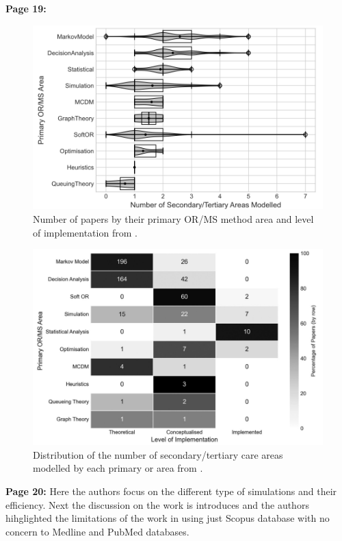     \textbf{Page 19:}
    \begin{figure}[H]
        \centering
        \includegraphics[width=.9\textwidth]{figures/SR0005GB23/fig7.png}
        \caption{Number of papers by their primary OR/MS method area and level of implementation from \cite{x122}.}
        \label{fig7:SR0005GB23}
    \end{figure}
    \begin{figure}[H]
        \centering
        \includegraphics[width=1\textwidth]{figures/SR0005GB23/fig8.png}
        \caption{Distribution of the number of secondary/tertiary care areas modelled by each primary or area from \cite{x122}.}
        \label{fig8:SR0005GB23}
    \end{figure}

    \textbf{Page 20:}
    Here the authors focus on the different type of simulations and their efficiency. Next the discussion on the work is introduces and the authors hihglighted the limitations of the work in using just Scopus database with no concern to Medline and PubMed databases.


